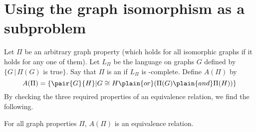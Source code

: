 \section{Using the graph isomorphism as a subproblem}
\label{sec:gi}

Let $\Pi$ be an arbitrary graph property (which holds for all isomorphic graphs if it holds for any one of them).
Let $L_\Pi$ be the language on graphs $G$ defined by $\{G\,|\,\Pi(G)$ is true$\}$.
Say that $\Pi$ is an  if $L_\Pi$ is \NP-complete.
Define $A(\Pi)$ by
\begin{displaymath}
  A(\Pi) = \{\pair{G}{H} | G\cong H \plain{or} (\Pi(G) \plain{and} \Pi(H))\}
\end{displaymath}
By checking the three required properties of an equivalence relation, we find the following.
\begin{proposition}
  For all graph properties $\Pi$, $A(\Pi)$ is an equivalence relation.
\end{proposition}

